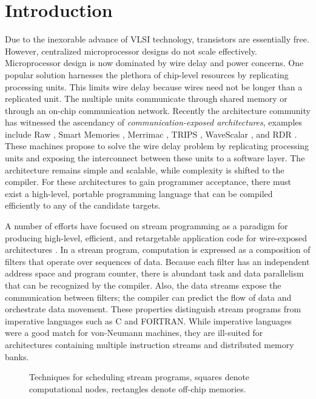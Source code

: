 \section{Introduction}

Due to the inexorable advance of VLSI technology, transistors are
essentially free.  However, centralized microprocessor designs do not
scale effectively.  Microprocessor design is now dominated by wire
delay and power concerns.  One popular solution harnesses the plethora of
chip-level resources by replicating processing units.  This limits
wire delay because wires need not be longer than a replicated unit.
The multiple units communicate through shared memory or through an
on-chip communication network.  Recently the architecture community
has witnessed the ascendancy of {\it communication-exposed architectures},
examples include Raw \cite{raw}, Smart Memories
\cite{smartmemories}, Merrimac \cite{merrimac-sc03}, TRIPS
\cite{trips}, WaveScalar \cite{wavescalar}, and RDR \cite{rdr}.  These
machines propose to solve the wire delay problem by replicating
processing units and exposing the interconnect between these units to
a software layer.  The architecture remains simple and scalable, while
complexity is shifted to the compiler. For these architectures to gain
programmer acceptance, there must exist a high-level, portable
programming language that can be compiled efficiently to any of the
candidate targets.

A number of efforts have focused on stream programming as a paradigm
for producing high-level, efficient, and retargetable application code
for wire-exposed architectures
\cite{streamit-asplos,imagine-ieee,merrimac-sc03,trips-isca03}.  In a
stream program, computation is expressed as a composition of filters
that operate over sequences of data.  Because each filter has an
independent address space and program counter, there is abundant task
and data parallelism that can be recognized by the compiler.  Also,
the data streams expose the communication between filters; the
compiler can predict the flow of data and orchestrate data movement.
These properties distinguish stream programs from imperative languages
such as C and FORTRAN.  While imperative languages were a good match
for von-Neumann machines, they are ill-suited for architectures
containing multiple instruction streams and distributed memory banks.

\begin{figure*}[th]
  \centering
  \vspace{-18pt}
  \vspace{-12pt}
  \caption{Techniques for scheduling stream programs, squares denote
computational nodes, rectangles denote off-chip memories.
 \protect\label{fig:spacevstime}}
  \vspace{-6pt}
\end{figure*}


